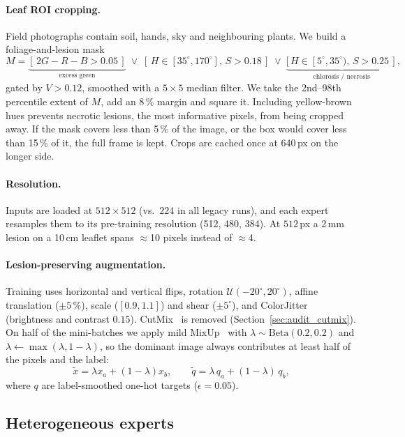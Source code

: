 \paragraph{Leaf ROI cropping.}
Field photographs contain soil, hands, sky and neighbouring plants. We build a
foliage-and-lesion mask
\begin{equation}
M = \underbrace{[\,2G-R-B > 0.05\,]}_{\text{excess green}}
\;\lor\; [\,H\in[35^\circ,170^\circ],\,S>0.18\,]
\;\lor\; \underbrace{[\,H\in[5^\circ,35^\circ),\,S>0.25\,]}_{\text{chlorosis / necrosis}},
\end{equation}
gated by $V>0.12$, smoothed with a $5{\times}5$ median filter. We take the 2nd--98th
percentile extent of $M$, add an 8\,\% margin and square it. Including
yellow-brown hues prevents necrotic lesions, the most informative pixels, from
being cropped away. If the mask covers less than 5\,\% of the image, or the box
would cover less than 15\,\% of it, the full frame is kept. Crops are cached once
at 640\,px on the longer side.

\paragraph{Resolution.}
Inputs are loaded at $512\times512$ (vs.\ $224$ in all legacy runs), and each
expert resamples them to its pre-training resolution (512, 480, 384). At
$512$\,px a 2\,mm lesion on a 10\,cm leaflet spans $\approx$10 pixels instead of
$\approx$4.

\paragraph{Lesion-preserving augmentation.}
Training uses horizontal and vertical flips, rotation $\mathcal{U}(-20^\circ,20^\circ)$,
affine translation ($\pm5\,\%$), scale ($[0.9,1.1]$) and shear ($\pm5^\circ$), and
ColorJitter (brightness and contrast $0.15$). CutMix~\cite{yun2019cutmix} is removed
(Section~\ref{sec:audit_cutmix}). On half of the mini-batches we apply mild MixUp~\cite{zhang2018mixup}
with $\lambda\sim\mathrm{Beta}(0.2,0.2)$ and $\lambda\leftarrow\max(\lambda,1-\lambda)$,
so the dominant image always contributes at least half of the pixels and the
label:
\begin{equation}
\tilde{x} = \lambda x_a + (1-\lambda)x_b,\qquad
\tilde{q} = \lambda\, q_a + (1-\lambda)\, q_b,
\end{equation}
where $q$ are label-smoothed one-hot targets ($\epsilon=0.05$).

\subsection{Heterogeneous experts}
\label{sec:method_experts}


